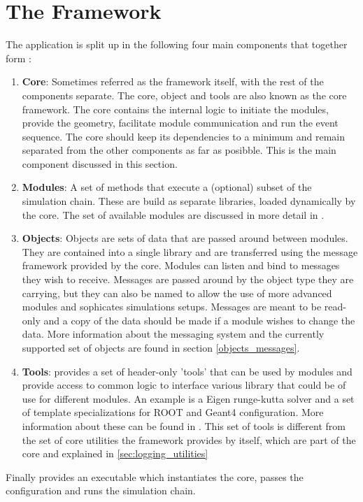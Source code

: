 \section{The \apsq Framework}
The application is split up in the following four main components that together form \apsq:
\begin{enumerate}
\item \textbf{Core}: Sometimes referred as the framework itself, with the rest of the components separate. The core, object and tools are also known as the core framework. The core contains the internal logic to initiate the modules, provide the geometry, facilitate module communication and run the event sequence. The core should keep its dependencies to a minimum and remain separated from the other components as far as posibble. This is the main component discussed in this section.
\item \textbf{Modules}: A set of methods that execute a (optional) subset of the simulation chain. These are build as separate libraries, loaded dynamically by the core. The set of available modules are discussed in more detail in \needref.
\item \textbf{Objects}: Objects are sets of data that are passed around between modules. They are contained into a single library and are transferred using the message framework provided by the core. Modules can listen and bind to messages they wish to receive. Messages are passed around by the object type they are carrying, but they can also be named to allow the use of more advanced modules and sophicates simulations setups. Messages are meant to be read-only and a copy of the data should be made if a module wishes to change the data. More information about the messaging system and the currently supported set of objects are found in section \ref{objects_messages}.
\item \textbf{Tools}: \apsq provides a set of header-only 'tools' that can be used by modules and provide access to common logic to interface various library that could be of use for different modules. An example is a Eigen runge-kutta solver and a set of template specializations for ROOT and Geant4 configuration. More information about these can be found in \needref. This set of tools is different from the set of core utilities the framework provides by itself, which are part of the core and explained in \ref{sec:logging_utilities}
\end{enumerate}
Finally \apsq provides an executable which instantiates the core, passes the configuration and runs the simulation chain.

